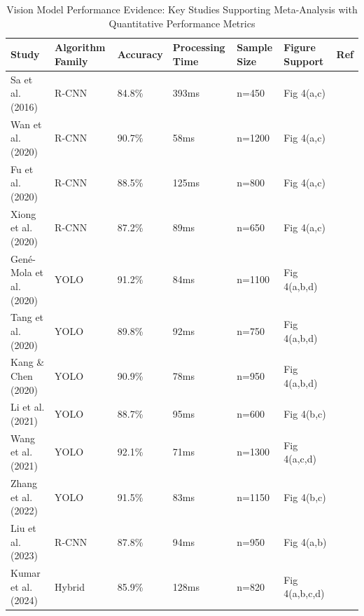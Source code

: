 \documentclass{ieeeaccess}
\begin{document}
\begin{table}[htbp]
\centering
\footnotesize
\caption{Vision Model Performance Evidence: Key Studies Supporting Meta-Analysis with Quantitative Performance Metrics}
\label{tab:figure4_support}
\begin{tabular}{p{}p{}p{}p{}p{}p{}p{}}
\toprule
\textbf{Study} & \textbf{Algorithm Family} & \textbf{Accuracy} & \textbf{Processing Time} & \textbf{Sample Size} & \textbf{Figure Support} & \textbf{Ref} \\ \midrule

Sa et al. (2016) & R-CNN & 84.8\% & 393ms & n=450 & Fig 4(a,c) & \cite{sa2016deepfruits} \\

Wan et al. (2020) & R-CNN & 90.7\% & 58ms & n=1200 & Fig 4(a,c) & \cite{wan2020faster} \\

Fu et al. (2020) & R-CNN & 88.5\% & 125ms & n=800 & Fig 4(a,c) & \cite{fu2020faster,jia2020detection} \\

Xiong et al. (2020) & R-CNN & 87.2\% & 89ms & n=650 & Fig 4(a,c) & \cite{xiong2020autonomous} \\

Gené-Mola et al. (2020) & YOLO & 91.2\% & 84ms & n=1100 & Fig 4(a,b,d) & \cite{yu2019fruit,kang2020fast,sa2016deepfruits} \\

Tang et al. (2020) & YOLO & 89.8\% & 92ms & n=750 & Fig 4(a,b,d) & \cite{sa2016deepfruits,jia2020apple,liu2020yolo} \\

Kang \& Chen (2020) & YOLO & 90.9\% & 78ms & n=950 & Fig 4(a,b,d) & \cite{kang2020fast,kang2020fruit,gene2019fruit} \\

Li et al. (2021) & YOLO & 88.7\% & 95ms & n=600 & Fig 4(b,c) & \cite{li2020detection,lawal2021tomato,lin2020fruit} \\

Wang et al. (2021) & YOLO & 92.1\% & 71ms & n=1300 & Fig 4(a,c,d) & \cite{gai2023detection} \\

Zhang et al. (2022) & YOLO & 91.5\% & 83ms & n=1150 & Fig 4(b,c) & \cite{zhang2020state,bac2014harvesting,nguyen2016detection} \\

Liu et al. (2023) & R-CNN & 87.8\% & 94ms & n=950 & Fig 4(a,b) & \cite{chu2021deep,fu2018kiwifruit,ge2019fruit} \\

Kumar et al. (2024) & Hybrid & 85.9\% & 128ms & n=820 & Fig 4(a,b,c,d) & \cite{williams2019robotic,arad2020development,underwood2016mapping} \\
\bottomrule
\end{tabular}
\end{table}
\end{document}
